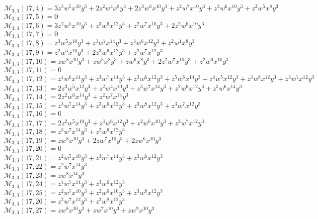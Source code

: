 $\mathcal{M}_{3,3}(17,4)=3z^3w^5x^{10}y^3+2z^2w^4x^8y^3+2z^3w^6x^{10}y^3+z^2w^7x^{10}y^3+z^2w^6x^{10}y^3+z^2w^5x^8y^3$\\
$\mathcal{M}_{3,3}(17,5)=0$\\
$\mathcal{M}_{3,3}(17,6)=3z^2w^5x^{10}y^3+z^3w^6x^{12}y^3+z^2w^7x^{10}y^3+2z^2w^6x^{10}y^3$\\
$\mathcal{M}_{3,3}(17,7)=0$\\
$\mathcal{M}_{3,3}(17,8)=z^3w^5x^{10}y^3+z^3w^7x^{14}y^3+z^3w^6x^{12}y^3+z^2w^4x^8y^3$\\
$\mathcal{M}_{3,3}(17,9)=z^2w^5x^{10}y^3+2z^3w^6x^{12}y^3+z^2w^7x^{12}y^3$\\
$\mathcal{M}_{3,3}(17,10)=zw^8x^{10}y^3+zw^5x^8y^3+zw^6x^8y^3+2z^2w^7x^{10}y^3+z^2w^6x^{10}y^3$\\
$\mathcal{M}_{3,3}(17,11)=0$\\
$\mathcal{M}_{3,3}(17,12)=z^4w^6x^{14}y^3+z^3w^7x^{14}y^3+z^3w^6x^{12}y^3+z^5w^6x^{14}y^3+z^4w^5x^{12}y^3+z^3w^8x^{12}y^3+z^3w^7x^{12}y^3$\\
$\mathcal{M}_{3,3}(17,13)=2z^3w^5x^{12}y^3+z^2w^4x^{10}y^3+z^3w^7x^{14}y^3+z^2w^6x^{12}y^3+z^3w^6x^{14}y^3$\\
$\mathcal{M}_{3,3}(17,14)=2z^2w^6x^{14}y^3+z^2w^7x^{14}y^3$\\
$\mathcal{M}_{3,3}(17,15)=z^3w^7x^{14}y^3+z^3w^6x^{12}y^3+z^3w^8x^{12}y^3+z^3w^7x^{12}y^3$\\
$\mathcal{M}_{3,3}(17,16)=0$\\
$\mathcal{M}_{3,3}(17,17)=2z^2w^5x^{10}y^3+z^3w^6x^{12}y^3+z^2w^6x^{10}y^3+z^3w^7x^{12}y^3$\\
$\mathcal{M}_{3,3}(17,18)=z^3w^7x^{14}y^3+z^2w^6x^{12}y^3$\\
$\mathcal{M}_{3,3}(17,19)=zw^8x^{10}y^3+2zw^7x^{10}y^3+2zw^6x^{10}y^3$\\
$\mathcal{M}_{3,3}(17,20)=0$\\
$\mathcal{M}_{3,3}(17,21)=z^2w^5x^{10}y^3+z^3w^7x^{14}y^3+z^3w^6x^{12}y^3$\\
$\mathcal{M}_{3,3}(17,22)=z^2w^7x^{14}y^3$\\
$\mathcal{M}_{3,3}(17,23)=zw^8x^{14}y^3$\\
$\mathcal{M}_{3,3}(17,24)=z^4w^7x^{14}y^3+z^3w^6x^{12}y^3$\\
$\mathcal{M}_{3,3}(17,25)=z^2w^7x^{10}y^3+z^2w^6x^{10}y^3+z^3w^8x^{12}y^3$\\
$\mathcal{M}_{3,3}(17,26)=z^2w^7x^{12}y^3+z^2w^8x^{12}y^3$\\
$\mathcal{M}_{3,3}(17,27)=zw^8x^{10}y^3+zw^7x^{10}y^3+zw^9x^{10}y^3$\\
